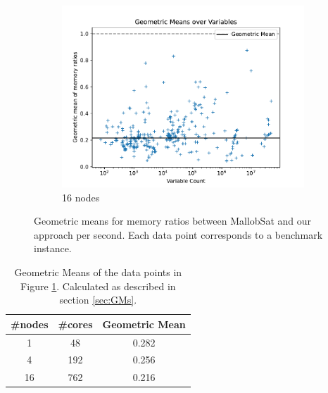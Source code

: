 \documentclass[12pt,a4paper,twoside]{scrartcl}
\numberwithin{equation}{section}
\begin{document}
\begin{figure}
\begin{subfigure}[c]{.45\textwidth}
    \includegraphics[scale=.45]{plots/16node_compare/mem_gm_over_vars.pdf}
    \caption{16 nodes}
  \end{subfigure}
  \caption{Geometric means for memory ratios between MallobSat and our approach per second. Each data point corresponds to a benchmark instance.}
  \label{fig:memGmVars}
\end{figure}

\begin{table}
  \center
  \begin{tabular}{ ccc }
    \toprule
    \#nodes & \#cores & Geometric Mean \\
    \midrule
    1  & 48  & 0.282\\
    4  & 192 & 0.256\\
    16 & 762 & 0.216\\
    \bottomrule
  \end{tabular}
  \caption{Geometric Means of the data points in Figure \ref{fig:memGmVars}. Calculated as described in section \ref{sec:GMs}.}
  \label{tab:memGM}
\end{table}
\end{document}
